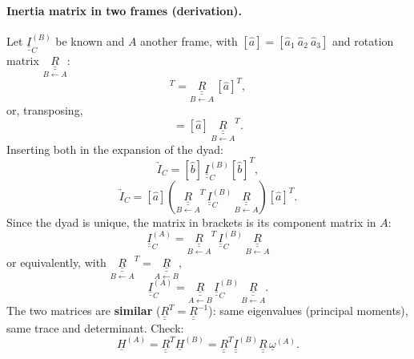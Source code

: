 \paragraph{Inertia matrix in two frames (derivation).} Let $\underline{\underline I}_C^{(B)}$ be known and $A$ another frame, with
$[\hat a]=[\hat a_1\ \hat a_2\ \hat a_3]$ and rotation matrix $\underset{B\leftarrow A}{\underline{\underline{R}}}$:
\begin{equation}
[\hat b]^T=\underset{B\leftarrow A}{\underline{\underline{R}}}\,[\hat a]^T,
\end{equation}
or, transposing,
\begin{equation}
[\hat b]=[\hat a]\,\underset{B\leftarrow A}{\underline{\underline{R}}}^{T}.
\end{equation}
Inserting both in the expansion of the dyad:
\begin{equation}
\underrightarrow{I}_C=[\hat b]\,\underline{\underline I}_C^{(B)}[\hat b]^T,
\end{equation}
\begin{equation}
\underrightarrow{I}_C=[\hat a]\left(\underset{B\leftarrow A}{\underline{\underline{R}}}^{T}\,\underline{\underline I}_C^{(B)}\,\underset{B\leftarrow A}{\underline{\underline{R}}}\right)[\hat a]^T .
\end{equation}
Since the dyad is unique, the matrix in brackets is its component matrix in $A$:
\begin{equation}
\boxed{\;\underline{\underline{I}}_{C}^{(A)}=\underset{B\leftarrow A}{\underline{\underline{R}}}^{T}\,\underline{\underline{I}}_{C}^{(B)}\,\underset{B\leftarrow A}{\underline{\underline{R}}}\;}
\end{equation}
or equivalently, with $\underset{B\leftarrow A}{\underline{\underline{R}}}^{T}=\underset{A\leftarrow B}{\underline{\underline{R}}}$,
\begin{equation}
\underline{\underline{I}}_{C}^{(A)}=\underset{A\leftarrow B}{\underline{\underline{R}}}\,\underline{\underline{I}}_{C}^{(B)}\,\underset{B\leftarrow A}{\underline{\underline{R}}}.
\end{equation}
The two matrices are \textbf{similar} ($\underline{\underline R}^T=\underline{\underline R}^{-1}$): same eigenvalues (principal moments), same trace and
determinant. Check:
\begin{equation}
\underline H^{(A)}=\underline{\underline R}^T\underline H^{(B)}=\underline{\underline R}^T\underline{\underline I}^{(B)}\underline{\underline R}\,\underline\omega^{(A)}.
\end{equation}

